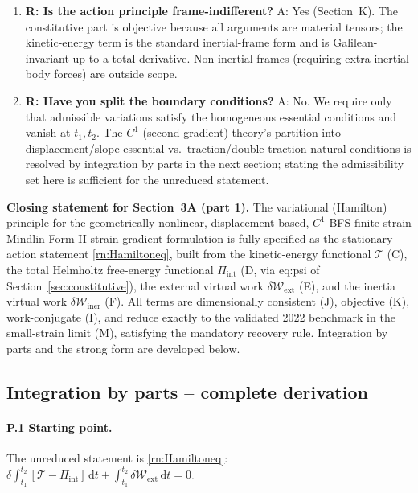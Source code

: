 \documentclass[11pt]{article}
\begin{document}
\begin{enumerate}
\item \textbf{R: Is the action principle frame-indifferent?}
A: Yes (Section~K). The constitutive part is objective because all arguments are material tensors; the kinetic-energy term is the standard inertial-frame form and is Galilean-invariant up to a total derivative. Non-inertial frames (requiring extra inertial body forces) are outside scope.

\item \textbf{R: Have you split the boundary conditions?}
A: No. We require only that admissible variations satisfy the homogeneous essential conditions and vanish at $t_{1},t_{2}$. The $C^{1}$ (second-gradient) theory's partition into displacement/slope essential vs.\ traction/double-traction natural conditions is resolved by integration by parts in the next section; stating the admissibility set here is sufficient for the unreduced statement.
\end{enumerate}

\noindent\textbf{Closing statement for Section~3A (part 1).} The variational (Hamilton) principle for the geometrically nonlinear, displacement-based, $C^{1}$ BFS finite-strain Mindlin Form-II strain-gradient formulation is fully specified as the stationary-action statement \eqref{rn:Hamiltoneq}, built from the kinetic-energy functional $\mathcal{T}$ (C), the total Helmholtz free-energy functional $\Pi_{\mathrm{int}}$ (D, via eq:psi of Section~\ref{sec:constitutive}), the external virtual work $\delta\mathcal{W}_{\mathrm{ext}}$ (E), and the inertia virtual work $\delta\mathcal{W}_{\mathrm{iner}}$ (F). All terms are dimensionally consistent (J), objective (K), work-conjugate (I), and reduce exactly to the validated 2022 benchmark in the small-strain limit (M), satisfying the mandatory recovery rule. Integration by parts and the strong form are developed below.

\subsection{Integration by parts -- complete derivation}
\label{subsec:ibp}

\paragraph{P.1 Starting point.}

The unreduced statement is \eqref{rn:Hamiltoneq}:
$\delta\int_{t_1}^{t_2}[\mathcal{T}-\Pi_{\mathrm{int}}]\,\mathrm{d}t+\int_{t_1}^{t_2}\delta\mathcal{W}_{\mathrm{ext}}\,\mathrm{d}t=0$.
\end{document}

